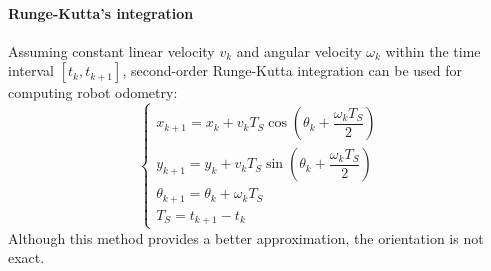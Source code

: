 \paragraph*{Runge-Kutta's integration}
Assuming constant linear velocity $v_k$ and angular velocity $\omega_k$ within the time interval $\left[ t_k,t_{k+1} \right]$, second-order Runge-Kutta integration can be used for computing robot odometry:
\[\begin{cases}
    x_{k+1} = x_k + v_kT_S\cos \left(\theta_k + \dfrac{\omega_kT_S}{2} \right)\\
    y_{k+1} = y_k + v_kT_S\sin\left(\theta_k + \dfrac{\omega_kT_S}{2} \right) \\
    \theta_{k+1} = \theta_k + \omega_kT_S \\
    T_S=t_{k+1}-t_k
\end{cases}\]
Although this method provides a better approximation, the orientation is not exact.

